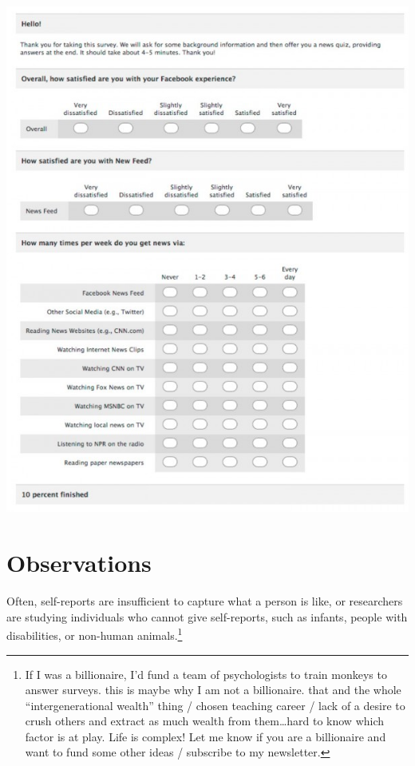 \documentclass[
  letterpaper,
  DIV=11,
  numbers=noendperiod,
  oneside]{scrreprt}
\begin{document}
\includegraphics[width=5.46875in,height=\textheight,keepaspectratio]{chapters/images/4L_fbsurvey2.png}

\section{Observations}\label{observations}

Often, self-reports are insufficient to capture what a person is like,
or researchers are studying individuals who cannot give self-reports,
such as infants, people with disabilities, or non-human
animals.\footnote{If I was a billionaire, I'd fund a team of
  psychologists to train monkeys to answer surveys. this is maybe why I
  am not a billionaire. that and the whole ``intergenerational wealth''
  thing / chosen teaching career / lack of a desire to crush others and
  extract as much wealth from them\ldots hard to know which factor is at
  play. Life is complex! Let me know if you are a billionaire and want
  to fund some other ideas / subscribe to my newsletter.

  \hfill\break
}
\end{document}
